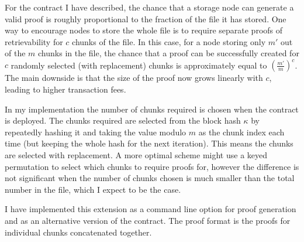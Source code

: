 \documentclass[12pt,a4paper,twoside,openright]{report}
\begin{document}
For the contract I have described, the chance that a storage node can generate a valid proof is roughly proportional to the fraction of the file it has stored.
One way to encourage nodes to store the whole file is to require separate proofs of retrievability for $c$ chunks of the file.
In this case, for a node storing only $m'$ out of the $m$ chunks in the file, the chance that a proof can be successfully created for $c$ randomly selected (with replacement) chunks is
approximately equal to $\left(\frac{m'}{m}\right)^c$.
The main downside is that the size of the proof now grows linearly with $c$,
leading to higher transaction fees.

In my implementation the number of chunks required is chosen when the contract is deployed.
The chunks required are selected from the block hash $\kappa$ by repeatedly hashing it and taking the value modulo $m$
as the chunk index each time (but keeping the whole hash for the next iteration).
This means the chunks are selected with replacement.
A more optimal scheme might use a keyed permutation to select which chunks to require proofs for,
however the difference is not significant when the number of chunks chosen is much smaller than the total number in the file, which
I expect to be the case.

I have implemented this extension as a command line option for proof generation and as an alternative version of the contract.
The proof format is the proofs for individual chunks concatenated together.


\end{document}
